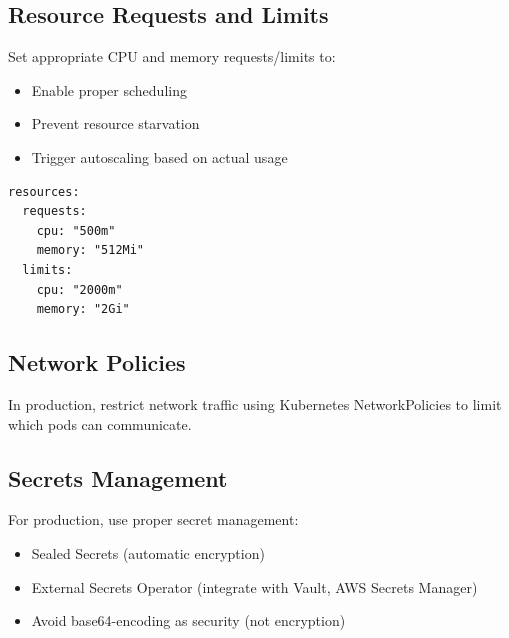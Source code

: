 \subsection{Resource Requests and Limits}

Set appropriate CPU and memory requests/limits to:
\begin{itemize}
  \item Enable proper scheduling
  \item Prevent resource starvation
  \item Trigger autoscaling based on actual usage
\end{itemize}

\begin{listing}[htbp]
\caption{Resource Configuration}
\label{lst:ch23-resources}
\begin{verbatim}
resources:
  requests:
    cpu: "500m"
    memory: "512Mi"
  limits:
    cpu: "2000m"
    memory: "2Gi"
\end{verbatim}
\end{listing}

\subsection{Network Policies}

In production, restrict network traffic using Kubernetes NetworkPolicies to limit which pods can communicate.

\subsection{Secrets Management}

For production, use proper secret management:
\begin{itemize}
  \item Sealed Secrets (automatic encryption)
  \item External Secrets Operator (integrate with Vault, AWS Secrets Manager)
  \item Avoid base64-encoding as security (not encryption)
\end{itemize}

